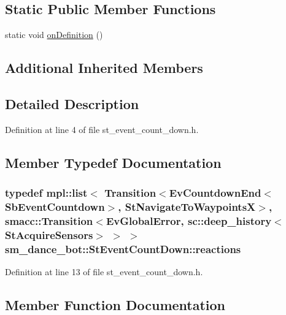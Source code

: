 \subsection*{Static Public Member Functions}
\begin{DoxyCompactItemize}
\item 
static void \hyperlink{structsm__dance__bot_1_1StEventCountDown_a93bb32fa9321d2babd851833eac44a6f}{on\+Definition} ()
\end{DoxyCompactItemize}
\subsection*{Additional Inherited Members}


\subsection{Detailed Description}


Definition at line 4 of file st\+\_\+event\+\_\+count\+\_\+down.\+h.



\subsection{Member Typedef Documentation}
\subsubsection[{\texorpdfstring{reactions}{reactions}}]{\setlength{\rightskip}{0pt plus 5cm}typedef mpl\+::list$<$ Transition$<$Ev\+Countdown\+End$<$Sb\+Event\+Countdown$>$, {\bf St\+Navigate\+To\+WaypointsX}$>$, {\bf smacc\+::\+Transition}$<${\bf Ev\+Global\+Error}, sc\+::deep\+\_\+history$<${\bf St\+Acquire\+Sensors}$>$ $>$ $>$ {\bf sm\+\_\+dance\+\_\+bot\+::\+St\+Event\+Count\+Down\+::reactions}}\hypertarget{structsm__dance__bot_1_1StEventCountDown_a9faee246b8150ab2b4a01a40bcdcac91}{}\label{structsm__dance__bot_1_1StEventCountDown_a9faee246b8150ab2b4a01a40bcdcac91}


Definition at line 13 of file st\+\_\+event\+\_\+count\+\_\+down.\+h.



\subsection{Member Function Documentation}
